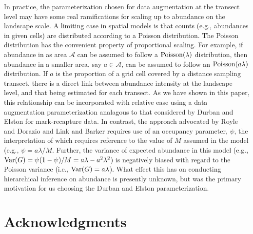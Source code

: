 \documentclass[10pt]{article}
\begin{document}
In practice, the parameterization chosen for data augmentation at the transect level may have some real ramifications for scaling up to abundance on the landscape scale.  A limiting case in spatial models is that counts (e.g., abundances in given cells) are distributed according to a Poisson distribution.  The Poisson distribution has the convenient property of proportional scaling.  For example, if abundance in as area $\mathcal{A}$  can be assumed to follow a ${\rm Poisson}(\lambda)$ distribution, then abundance in a smaller area, say $a \in \mathcal{A}$, can be assumed to follow an ${\rm Poisson}(a\lambda)$ distribution.  If $a$ is the proportion of a grid cell covered by a distance sampling transect, there is a direct link between abundance intensity at the landscape level, and that being estimated for each transect.  As we have shown in this paper, this relationship can be incorporated with relative ease using a data augmentation parameterization analagous to that considered by Durban and Elston \cite{DurbanElston2005} for mark-recapture data. In contrast, the approach advocated by Royle and Dorazio \cite{RoyleDorazio2008} and Link and Barker \cite{LinkBarker2010} requires use of an occupancy parameter, $\psi$, the interpretation of which requires reference to the value of $M$ assumed in the model (e.g., $\psi=a\lambda/M$.  Further, the variance of expected abundance in this model (e.g., ${\rm Var}(G)=\psi (1-\psi)/M = a\lambda-a^2\lambda^2$) is negatively biased with regard to the Poisson variance (i.e., ${\rm Var}(G)=a\lambda$).  What effect this has on conducting hierarchical inference on abundance is presently unknown, but was the primary motivation for us choosing the Durban and Elston \cite{DurbanElston2005} parameterization.


\section*{Acknowledgments}



\clearpage

\end{document}
